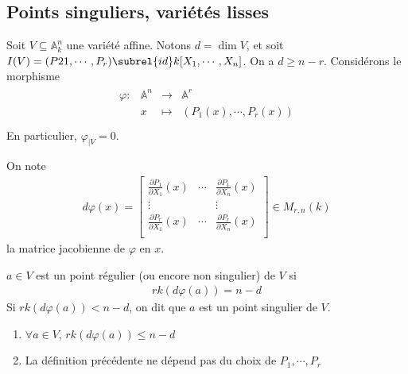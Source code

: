         \subsection{Points singuliers, variétés lisses}
            Soit $V \subseteq \mathbb{A}^n_k$ une variété affine. Notons $d = \dim V$, et soit $I(V) = (P21, \cdots, P_r) \subrel{id} k[X_1, \cdots, X_n]$. On a $d \geq n - r$. Considérons le morphisme
            \begin{align*}
                \begin{array}{cccc}
                    \varphi : & \mathbb{A}^n & \to & \mathbb{A}^r \\
                    & x & \mapsto & (P_1(x), \cdots, P_r(x)) \\
                \end{array}
            \end{align*}
            En particulier, $\varphi_{|V} = 0$.
            \begin{nota}
                On note
                \begin{align*}
                    d \varphi (x) = 
                    \begin{bmatrix}
                        \frac{\partial P_1}{\partial X_1}(x) & \cdots & \frac{\partial P_1}{\partial X_n}(x) \\
                        \vdots & & \vdots \\
                        \frac{\partial P_r}{\partial X_1}(x) & \cdots & \frac{\partial P_r}{\partial X_n}(x) \\
                    \end{bmatrix}
                    \in M_{r, n}(k)
                \end{align*}
                la matrice jacobienne de $\varphi$ en $x$.
            \end{nota}
            \begin{defi}
                $a \in V$ est un point régulier (ou encore non singulier) de $V$ si 
                \begin{align*}
                    rk (d \varphi(a)) = n - d
                \end{align*}
                Si $rk (d \varphi(a)) < n - d$, on dit que $a$ est un point singulier de $V$.
            \end{defi}
            \begin{remq}
                \begin{enumerate}
                    \item $\forall a \in V$, $rk (d \varphi(a)) \leq n - d$
                    \item La définition précédente ne dépend pas du choix de $P_1, \cdots, P_r$
                \end{enumerate}
            \end{remq}
